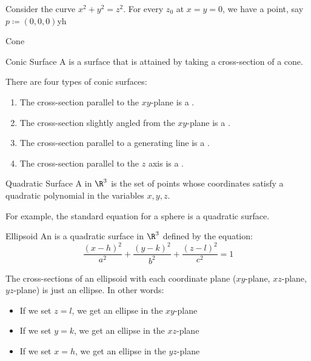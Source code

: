 \begin{exbox}{}{}
    Consider the curve $x^2+y^2=z^2$. For every $z_0$ at $x=y=0$, we have a point, say $p \coloneq (0,0,0)$yh
\end{exbox}

\begin{dfnbox}{Cone}{}

\end{dfnbox}

\begin{dfnbox}{Conic Surface}{}
    A  is a surface that is attained by taking a cross-section of a cone.
\end{dfnbox}

There are four types of conic surfaces:
\begin{enumerate}[noitemsep]
    \item The cross-section parallel to the $xy$-plane is a .
    \item The cross-section slightly angled from the $xy$-plane is a .
    \item The cross-section parallel to a generating line is a .
    \item The cross-section parallel to the $z$ axis is a .
\end{enumerate}

\begin{dfnbox}{Quadratic Surface}{}
    A  in $\R^3$ is the set of points whose coordinates satisfy a quadratic polynomial in the variables $x,y,z$.
\end{dfnbox}

For example, the standard equation for a sphere is a quadratic surface.

\begin{dfnbox}{Ellipsoid}{}
    An  is a quadratic surface in $\R^3$ defined by the equation:
    \[ \frac{(x-h)^2}{a^2} + \frac{(y-k)^2}{b^2} + \frac{(z-l)^2}{c^2} = 1 \]
\end{dfnbox}

The cross-sections of an ellipsoid with each coordinate plane ($xy$-plane, $xz$-plane, $yz$-plane) is just an ellipse. In other words:
\begin{itemize}[noitemsep]
    \item If we set $z = l$, we get an ellipse in the $xy$-plane
    \item If we set $y = k$, we get an ellipse in the $xz$-plane
    \item If we set $x = h$, we get an ellipse in the $yz$-plane
\end{itemize}

